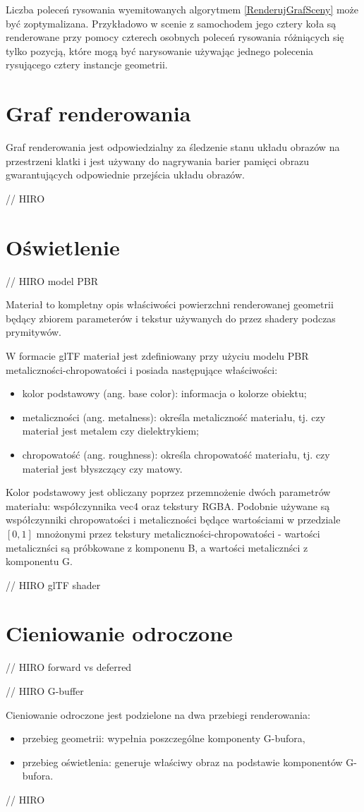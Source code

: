 Liczba poleceń rysowania wyemitowanych algorytmem \ref{RenderujGrafSceny} może być zoptymalizana.
Przykładowo w scenie z samochodem jego cztery koła są renderowane przy pomocy czterech osobnych poleceń rysowania różniących się tylko pozycją, które mogą być narysowanie używając jednego polecenia rysującego cztery instancje geometrii.

\section{Graf renderowania}

Graf renderowania jest odpowiedzialny za śledzenie stanu układu obrazów na przestrzeni klatki i jest używany do
nagrywania barier pamięci obrazu gwarantujących odpowiednie przejścia układu obrazów.

// HIRO

\section{Oświetlenie}

// HIRO model PBR

Materiał to kompletny opis właściwości powierzchni renderowanej geometrii będący zbiorem parameterów i tekstur używanych do przez shadery podczas prymitywów.

W formacie glTF materiał jest zdefiniowany przy użyciu modelu PBR metaliczności-chropowatości i posiada następujące właściwości:
\begin{itemize}
	\item kolor podstawowy (ang. base color): informacja o kolorze obiektu;
	\item metaliczności (ang. metalness): określa metaliczność materiału, tj. czy materiał jest metalem czy dielektrykiem;
	\item chropowatość (ang. roughness): określa chropowatość materiału, tj. czy materiał jest błyszczący czy matowy.
\end{itemize}

Kolor podstawowy jest obliczany poprzez przemnożenie dwóch parametrów materiału: współczynnika vec4 oraz tekstury RGBA.
Podobnie używane są współczynniki chropowatości i metaliczności będące wartościami w przedziale $\left[0,1\right]$ mnożonymi przez tekstury metaliczności-chropowatości - wartości metalicznści są próbkowane z komponenu B, a wartości metalicznści z komponentu G.

// HIRO glTF shader

\section{Cieniowanie odroczone}

// HIRO forward vs deferred

// HIRO G-buffer

Cieniowanie odroczone jest podzielone na dwa przebiegi renderowania:
\begin{itemize}
	\item przebieg geometrii: wypełnia poszczególne komponenty G-bufora,
	\item przebieg oświetlenia: generuje właściwy obraz na podstawie komponentów G-bufora.
\end{itemize}

// HIRO 
